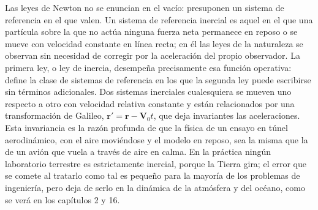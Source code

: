 \documentclass[10pt,openany]{book}
\begin{document}
Las leyes de Newton no se enuncian en el vacío: presuponen un sistema de referencia en el que valen. Un sistema de referencia inercial es aquel en el que una partícula sobre la que no actúa ninguna fuerza neta permanece en reposo o se mueve con velocidad constante en línea recta; en él las leyes de la naturaleza se observan sin necesidad de corregir por la aceleración del propio observador. La primera ley, o ley de inercia, desempeña precisamente esa función operativa: define la clase de sistemas de referencia en los que la segunda ley puede escribirse sin términos adicionales. Dos sistemas inerciales cualesquiera se mueven uno respecto a otro con velocidad relativa constante y están relacionados por una transformación de Galileo, \(\mathbf{r}' = \mathbf{r} - \mathbf{V}_0 t\), que deja invariantes las aceleraciones. Esta invariancia es la razón profunda de que la física de un ensayo en túnel aerodinámico, con el aire moviéndose y el modelo en reposo, sea la misma que la de un avión que vuela a través de aire en calma. En la práctica ningún laboratorio terrestre es estrictamente inercial, porque la Tierra gira; el error que se comete al tratarlo como tal es pequeño para la mayoría de los problemas de ingeniería, pero deja de serlo en la dinámica de la atmósfera y del océano, como se verá en los capítulos 2 y 16.
\end{document}
